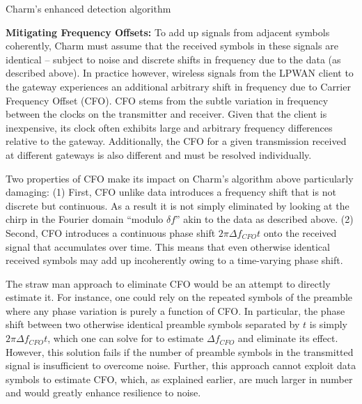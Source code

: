 \LinesNumbered
\begin{algorithm}[ht]
\caption{Charm's enhanced detection algorithm}
\label{alg:algorithm-label2}
\end{algorithm}

\noindent \textbf{Mitigating Frequency Offsets: } To add up signals from
adjacent symbols coherently, Charm must assume that the received symbols in
these signals are identical -- subject to noise and discrete shifts in
frequency due to the data (as described above). In practice however, wireless
signals from the LPWAN client to the gateway experiences an additional
arbitrary shift in frequency due to Carrier Frequency Offset (CFO). CFO stems
from the subtle variation in frequency between the clocks on the transmitter
and receiver. Given that the client is inexpensive, its clock often exhibits
large and arbitrary frequency differences relative to the gateway.
Additionally, the CFO for a given transmission received at different gateways
is also different and must be resolved individually.

Two properties of CFO make its impact on Charm's algorithm above particularly
damaging: (1) First, CFO unlike data introduces a frequency shift that is not
discrete but continuous. As a result it is not simply eliminated by looking at
the chirp in the Fourier domain ``modulo $\delta f$''  akin to the data as
described above. (2) Second, CFO introduces a continuous phase shift $2 \pi
\Delta f_{CFO} t$ onto the received signal that accumulates over time. This
means that even otherwise identical received symbols may add up incoherently
owing to a time-varying phase shift.

The straw man approach to eliminate CFO would be an attempt to directly
estimate it. For instance, one could rely on the repeated symbols of the
preamble where any phase variation is purely a function of CFO. In particular,
the phase shift between two otherwise identical preamble symbols separated by
$t$ is simply $2 \pi \Delta f_{CFO} t$, which one can solve for to estimate $\Delta
f_{CFO}$ and eliminate its effect. However, this solution fails if the number of preamble symbols in the transmitted signal is insufficient to overcome noise. Further, this approach cannot exploit data symbols to estimate CFO, which, as explained earlier, are much larger in number and would greatly enhance resilience to noise.

